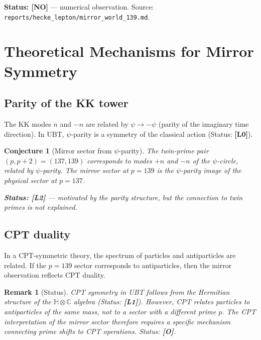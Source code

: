 \documentclass[11pt,a4paper]{article}
\newtheorem{remark}{Remark}
\newtheorem{conjecture}{Conjecture}
\begin{document}
\textbf{Status: [NO]} — numerical observation.  Source: \texttt{reports/hecke\_lepton/mirror\_world\_139.md}.

\section{Theoretical Mechanisms for Mirror Symmetry}
\label{sec:mechanisms}

\subsection{Parity of the KK tower}

The KK modes $n$ and $-n$ are related by $\psi \to -\psi$ (parity of the
imaginary time direction).  In UBT, $\psi$-parity is a symmetry of the
classical action (Status: \textbf{[L0]}).

\begin{conjecture}[Mirror sector from $\psi$-parity]\label{conj:psi_parity}
  The twin-prime pair $(p, p+2) = (137, 139)$ corresponds to modes $+n$ and
  $-n$ of the $\psi$-circle, related by $\psi$-parity.  The mirror sector at
  $p = 139$ is the $\psi$-parity image of the physical sector at $p = 137$.

  \textbf{Status: [L2]} — motivated by the parity structure, but the
  connection to twin primes is not explained.
\end{conjecture}

\subsection{CPT duality}

In a CPT-symmetric theory, the spectrum of particles and antiparticles are
related.  If the $p = 139$ sector corresponds to antiparticles, then the
mirror observation reflects CPT duality.

\begin{remark}[Status]
  CPT symmetry in UBT follows from the Hermitian structure of the
  $\mathbb{H}\otimes\mathbb{C}$ algebra (Status: \textbf{[L1]}).
  However, CPT relates particles to antiparticles \emph{of the same mass},
  not to a sector with a different prime $p$.  The CPT interpretation of
  the mirror sector therefore requires a specific mechanism connecting
  prime shifts to CPT operations.  Status: \textbf{[O]}.
\end{remark}
\end{document}
